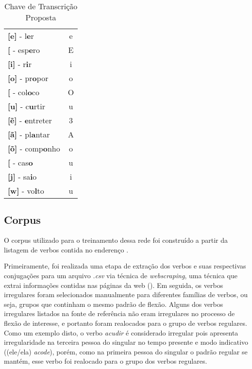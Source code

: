 \begin{table}[H]
\begin{center}
\begin{tabular}{lc}
\textbf{{[}e{]}} - l\textbf{e}r & e \\
\textbf{{[}\textepsilon{]}} - esp\textbf{e}ro & E \\
\textbf{{[}i{]}} - r\textbf{i}r & i \\
\textbf{{[}o{]}} - pr\textbf{o}por & o \\
\textbf{{[}\textopeno{]} }- col\textbf{o}co & O \\
\textbf{{[}u{]}} - c\textbf{u}rtir & u \\
\textbf{{[}\~e{]}} - \textbf{e}ntreter & 3 \\
\textbf{{[}ã{]}} - pl\textbf{a}ntar & A \\
\textbf{{[}\~o{]}} - comp\textbf{o}nho & o \\
\textbf{{[}\textupsilon{]}} - cas\textbf{o} & u \\
\textbf{{[}j{]}} - sa\textbf{i}o & i \\
\textbf{{[}w{]}} - vo\textbf{l}to & u
\end{tabular}
\end{center}
\caption{Chave de Transcrição Proposta}
\label{tab:chave}
\end{table}

\subsection{Corpus}

O corpus utilizado para o treinamento dessa rede foi construído a partir da listagem de verbos contida no enderenço .

Primeiramente, foi realizada uma etapa de extração dos verbos e suas respectivas conjugações para um arquivo \textit{.csv} via técnica de \textit{webscraping}, uma técnica que extrai informações contidas nas páginas da web (\cite{mitchell:2015}). Em seguida, os verbos irregulares foram selecionados manualmente para diferentes famílias de verbos, ou seja, grupos que continham o mesmo padrão de flexão. Alguns dos verbos irregulares listados na fonte de referência não eram irregulares no processo de flexão de interesse, e portanto foram realocados para o grupo de verbos regulares. Como um exemplo disto, o verbo \textit{acudir} é considerado irregular pois apresenta irregularidade na terceira pessoa do singular no tempo presente e modo indicativo ((ele/ela) \textit{acode}), porém, como na primeira pessoa do singular o padrão regular se mantém, esse verbo foi realocado para o grupo dos verbos regulares. 

